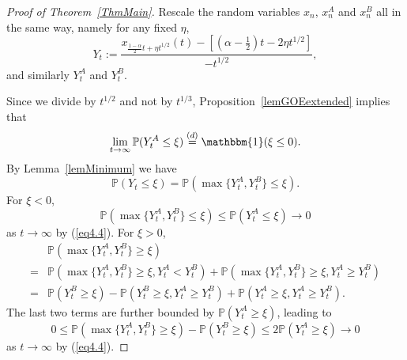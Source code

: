 \documentclass[12pt,a4paper]{article}
\numberwithin{equation}{section}
\newcommand{\Pb}{\mathbb{P}}
\newcommand{\Id}{\mathbbm{1}}
\begin{document}
\begin{proof}[Proof of Theorem~\ref{ThmMain}]
Rescale the random variables $x_n$, $x^A_n$ and $x_n^B$ all in the same way, namely for any fixed $\eta$,
\begin{equation}
Y_t:=\frac{x_{\frac{1-\alpha}{2}t+\eta t^{1/2}}(t)-\left[(\alpha-\tfrac12)t-2\eta t^{1/2}\right]}{-t^{1/2}},
\end{equation}
and similarly $Y_t^A$ and $Y_t^B$.

Since we divide by $t^{1/2}$ and not by $t^{1/3}$, Proposition~\ref{lemGOEextended} implies that
\begin{equation}\label{eq4.4}
\lim_{t\to\infty}\Pb(Y^A_t\leq \xi)\stackrel{(d)}{=}\Id(\xi\leq 0).
\end{equation}
By Lemma~\ref{lemMinimum} we have
\begin{equation}
\Pb\left(Y_t\leq \xi\right) =\Pb\left(\max\{Y^A_t,Y^B_t\}\leq \xi\right).
\end{equation}
For $\xi<0$,
\begin{equation}
\Pb\left(\max\{Y^A_t,Y^B_t\}\leq \xi\right) \leq \Pb\left(Y^A_t\leq \xi\right)\to 0
\end{equation}
as $t\to\infty$ by (\ref{eq4.4}).
For $\xi>0$,
\begin{equation}
\begin{aligned}
&\Pb\left(\max\{Y^A_t,Y^B_t\}\geq \xi\right) \\
=& \Pb\left(\max\{Y^A_t,Y^B_t\}\geq \xi, Y^A_t<Y^B_t\right)+\Pb\left(\max\{Y^A_t,Y^B_t\}\geq \xi, Y^A_t\geq Y^B_t\right)\\
=& \Pb\left(Y^B_t\geq \xi\right)-\Pb\left(Y^B_t\geq \xi, Y^A_t\geq Y^B_t\right)+\Pb\left(Y^A_t\geq \xi, Y^A_t\geq Y^B_t\right).
\end{aligned}
\end{equation}
The last two terms are further bounded by $\Pb\left(Y^A_t\geq \xi\right)$, leading to
\begin{equation}
0\leq \Pb\left(\max\{Y^A_t,Y^B_t\}\geq \xi\right) - \Pb\left(Y^B_t\geq \xi\right)\leq 2 \Pb\left(Y^A_t\geq \xi\right)\to 0
\end{equation}
as $t\to\infty$ by (\ref{eq4.4}).
\end{proof}
\end{document}
